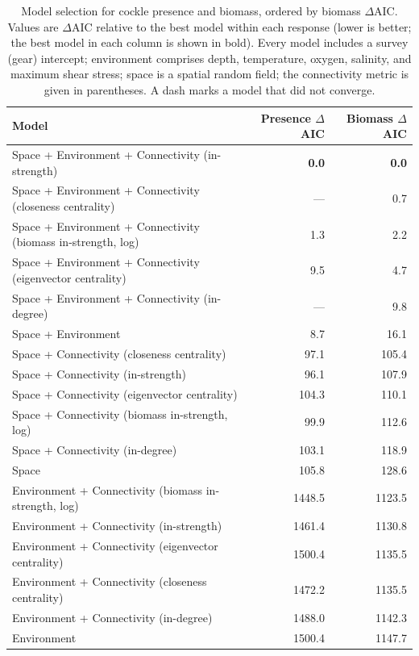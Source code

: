 \begin{table}[ht]
\centering
\caption{Model selection for cockle presence and biomass, ordered by biomass $\Delta$AIC. Values are $\Delta$AIC relative to the best model within each response (lower is better; the best model in each column is shown in bold). Every model includes a survey (gear) intercept; environment comprises depth, temperature, oxygen, salinity, and maximum shear stress; space is a spatial random field; the connectivity metric is given in parentheses. A dash marks a model that did not converge.}
\label{tab:model-selection}
\begin{tabular}{lrr}
\toprule
Model & Presence $\Delta$AIC & Biomass $\Delta$AIC \\
\midrule
Space + Environment + Connectivity (in-strength) & \textbf{0.0} & \textbf{0.0} \\
Space + Environment + Connectivity (closeness centrality) & --- & 0.7 \\
Space + Environment + Connectivity (biomass in-strength, log) & 1.3 & 2.2 \\
Space + Environment + Connectivity (eigenvector centrality) & 9.5 & 4.7 \\
Space + Environment + Connectivity (in-degree) & --- & 9.8 \\
Space + Environment & 8.7 & 16.1 \\
Space + Connectivity (closeness centrality) & 97.1 & 105.4 \\
Space + Connectivity (in-strength) & 96.1 & 107.9 \\
Space + Connectivity (eigenvector centrality) & 104.3 & 110.1 \\
Space + Connectivity (biomass in-strength, log) & 99.9 & 112.6 \\
Space + Connectivity (in-degree) & 103.1 & 118.9 \\
Space & 105.8 & 128.6 \\
Environment + Connectivity (biomass in-strength, log) & 1448.5 & 1123.5 \\
Environment + Connectivity (in-strength) & 1461.4 & 1130.8 \\
Environment + Connectivity (eigenvector centrality) & 1500.4 & 1135.5 \\
Environment + Connectivity (closeness centrality) & 1472.2 & 1135.5 \\
Environment + Connectivity (in-degree) & 1488.0 & 1142.3 \\
Environment & 1500.4 & 1147.7 \\
\bottomrule
\end{tabular}
\end{table}
